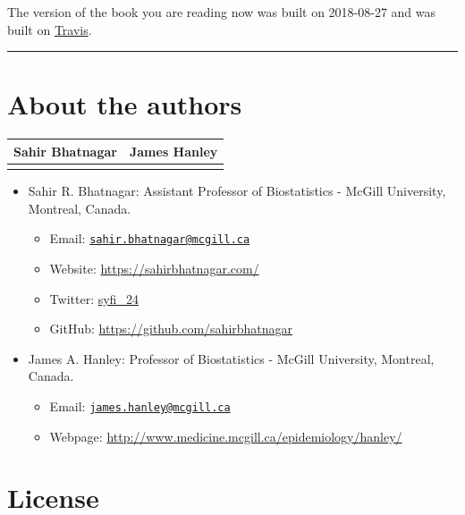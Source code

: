 \documentclass[]{book}
\providecommand{\tightlist}{%
  \setlength{\itemsep}{0pt}\setlength{\parskip}{0pt}}
\providecommand{\tightlist}{%
  \setlength{\itemsep}{0pt}\setlength{\parskip}{0pt}}
\theoremstyle{definition}
\theoremstyle{definition}
\theoremstyle{definition}
\theoremstyle{remark}
\begin{document}
The version of the book you are reading now was built on 2018-08-27 and
was built on
\href{https://travis-ci.org/sahirbhatnagar/MATH697}{Travis}.

\begin{center}\rule{0.5\linewidth}{\linethickness}\end{center}

\section*{About the authors}\label{about-the-authors}

\begin{longtable}[]{@{}cc@{}}
\toprule
Sahir Bhatnagar & James Hanley\tabularnewline
\midrule
\endhead
&\tabularnewline
\bottomrule
\end{longtable}

\begin{itemize}
\tightlist
\item
  Sahir R. Bhatnagar: Assistant Professor of Biostatistics - McGill
  University, Montreal, Canada.

  \begin{itemize}
  \tightlist
  \item
    Email:
    \href{mailto:sahir.bhatnagar@mcgill.ca}{\nolinkurl{sahir.bhatnagar@mcgill.ca}}
  \item
    Website: \url{https://sahirbhatnagar.com/}\\
  \item
    Twitter: \href{https://twitter.com/syfi_24}{syfi\_24}\\
  \item
    GitHub: \url{https://github.com/sahirbhatnagar}\\
  \end{itemize}
\item
  James A. Hanley: Professor of Biostatistics - McGill University,
  Montreal, Canada.

  \begin{itemize}
  \tightlist
  \item
    Email:
    \href{mailto:james.hanley@mcgill.ca}{\nolinkurl{james.hanley@mcgill.ca}}\\
  \item
    Webpage: \url{http://www.medicine.mcgill.ca/epidemiology/hanley/}
  \end{itemize}
\end{itemize}

\section*{License}\label{license}
\end{document}
